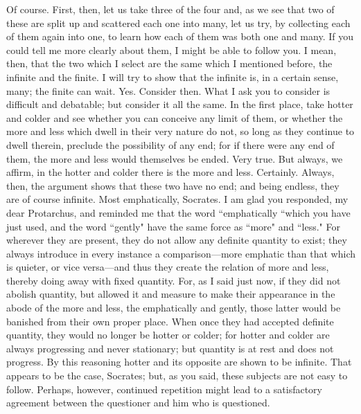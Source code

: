 \documentclass[letterpaper,12pt]{article}
\newcommand{\stephpag}[1]{\marginnote{\small\itshape\fontfamily{ppl}\selectfont #1}}
\begin{document}
\begin{drama}
\protarchusspeaks
Of course.
\socratesspeaks
First, then, let us take three of the four and, as we see that two of these are split up and scattered each one into many, let us try, by collecting each of them again into one, to learn how each of them was both one and many.
\protarchusspeaks
If you could tell me more clearly about them, I might be able to follow you. \stephpag{24 a}
\socratesspeaks
I mean, then, that the two which I select are the same which I mentioned before, the infinite and the finite. I will try to show that the infinite is, in a certain sense, many; the finite can wait.
\protarchusspeaks
Yes.
\socratesspeaks
Consider then. What I ask you to consider is difficult and debatable; but consider it all the same. In the first place, take hotter and colder and see whether you can conceive any limit of them, or whether the more and less which dwell in their very nature do not, so long as they continue to dwell therein, \stephpag{b} preclude the possibility of any end; for if there were any end of them, the more and less would themselves be ended.
\protarchusspeaks
Very true.
\socratesspeaks
But always, we affirm, in the hotter and colder there is the more and less.
\protarchusspeaks
Certainly.
\socratesspeaks
Always, then, the argument shows that these two have no end; and being endless, they are of course infinite.
\protarchusspeaks
Most emphatically, Socrates.
\socratesspeaks
I am glad you responded, my dear Protarchus, \stephpag{c} and reminded me that the word ``emphatically ``which you have just used, and the word ``gently" have the same force as ``more" and ``less." For wherever they are present, they do not allow any definite quantity to exist; they always introduce in every instance a comparison---more emphatic than that which is quieter, or vice versa---and thus they create the relation of more and less, thereby doing away with fixed quantity. For, as I said just now, if they did not abolish quantity, but allowed it and measure to make their appearance in the abode of the more and less, \stephpag{d} the emphatically and gently, those latter would be banished from their own proper place. When once they had accepted definite quantity, they would no longer be hotter or colder; for hotter and colder are always progressing and never stationary; but quantity is at rest and does not progress. By this reasoning hotter and its opposite are shown to be infinite.
\protarchusspeaks
That appears to be the case, Socrates; but, as you said, these subjects are not easy to follow. Perhaps, however, \stephpag{e} continued repetition might lead to a satisfactory agreement between the questioner and him who is questioned.

\end{drama}
\end{document}
